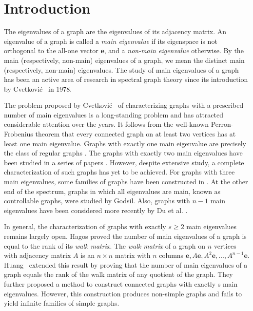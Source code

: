 \documentclass[11pt,oneside]{article}
\theoremstyle{plain}
\theoremstyle{plain}
\theoremstyle{definition}
\numberwithin{figure}{section}
\theoremstyle{remark}
\numberwithin{equation}{section}
\begin{document}
	
	\section{Introduction}
	\noindent
	The eigenvalues of a graph are the eigenvalues of its adjacency matrix. 
	An eigenvalue of a graph is called a \emph{main eigenvalue} if its eigenspace is not orthogonal to the all-one vector $\mathbf{e}$, and a \emph{non-main eigenvalue} otherwise. By the main (respectively, non-main) eigenvalues of a graph, we mean the distinct main (respectively, non-main) eigenvalues. 
	The study of main eigenvalues of a graph has been an active area of research in spectral graph theory since its introduction by Cvetkovi\'c~\cite{cvetkovic2} in 1978. 
	
	
	
	
	
	\par The problem proposed by Cvetković~\cite{cvetkovic2} of characterizing graphs with a prescribed number of main eigenvalues is a long-standing problem and has attracted considerable attention over the years. It follows from the well-known Perron-Frobenius theorem that every connected graph on at least two vertices has at least one main eigenvalue. Graphs with exactly one main eigenvalue are precisely the class of regular graphs \cite{cvetkovic2}. The graphs with exactly two main eigenvalues have been studied in a series of papers \cite{hagos, rowlinson, hou1, hou2, hou3, ghebleh}. However, despite extensive study, a complete characterization of such graphs has yet to be achieved. For graphs with three main eigenvalues, some families of graphs have been constructed in \cite{franca2026}. At the other end of the spectrum, graphs in which all eigenvalues are main, known as controllable graphs, were studied by Godsil\cite{godsil}. Also, graphs with $n-1$ main eigenvalues have been considered more recently by Du et al. \cite{du1,du2}. 
	
	In general, the characterization of graphs with exactly \( s \ge 2 \) main eigenvalues remains largely open. Hagos \cite{hagos} proved the number of main eigenvalues of a graph is equal to the rank of its \textit{walk matrix}. The \textit{walk matrix} of a graph on $n$ vertices with adjacency matrix $A$ is an $n \times n$ matrix with $n$ columns $\mathbf{e}, A\mathbf{e}, A^2\mathbf{e}, \dots, A^{n-1}\mathbf{e}.$ Huang~\cite{huang} extended this result by proving that the number of main eigenvalues of a graph equals the rank of the walk matrix of any quotient of the graph. They further proposed a method to construct connected graphs with exactly s main eigenvalues. However, this construction produces non-simple graphs and fails to yield infinite families of simple graphs.
	
\end{document}
